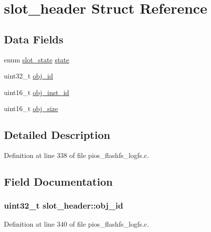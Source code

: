 \hypertarget{structslot__header}{\section{slot\-\_\-header \-Struct \-Reference}
\label{structslot__header}
}
\subsection*{\-Data \-Fields}
\begin{DoxyCompactItemize}
\item 
enum \hyperlink{group___p_i_o_s___f_l_a_s_h_f_s_ga7df58e5fca7cec32767a0481da453e74}{slot\-\_\-state} \hyperlink{structslot__header_a5bfcf2f73ad00e1f416dd3b9a557b7a3}{state}
\item 
uint32\-\_\-t \hyperlink{structslot__header_aa004e58ab0609d8c239530017730b5c1}{obj\-\_\-id}
\item 
uint16\-\_\-t \hyperlink{structslot__header_a61928fad0e752c278fb8485aa199240d}{obj\-\_\-inst\-\_\-id}
\item 
uint16\-\_\-t \hyperlink{structslot__header_ada9f3086c54142732ee8e98e88a65d3a}{obj\-\_\-size}
\end{DoxyCompactItemize}


\subsection{\-Detailed \-Description}


\-Definition at line 338 of file pios\-\_\-flashfs\-\_\-logfs.\-c.



\subsection{\-Field \-Documentation}
\hypertarget{structslot__header_aa004e58ab0609d8c239530017730b5c1}{
\subsubsection[{obj\-\_\-id}]{\setlength{\rightskip}{0pt plus 5cm}uint32\-\_\-t {\bf slot\-\_\-header\-::obj\-\_\-id}}}\label{structslot__header_aa004e58ab0609d8c239530017730b5c1}


\-Definition at line 340 of file pios\-\_\-flashfs\-\_\-logfs.\-c.

